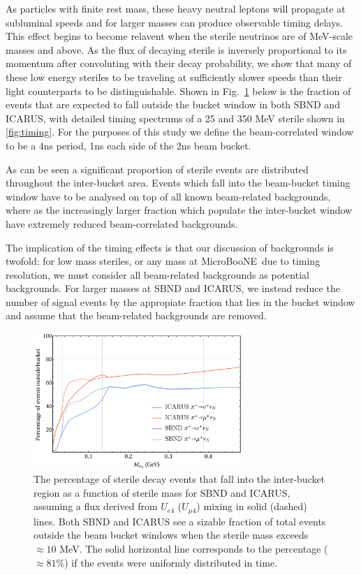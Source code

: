\documentclass[11pt, a4paper]{article}
\newcommand{\reffig}[1]{Fig.~\ref{#1}}
\def\muboone{MicroBooNE}
\begin{document}
As particles with finite rest mass, these heavy neutral leptons will propagate
at subluminal speeds and for larger masses can produce observable timing
delays. This effect begins to become relavent when the sterile neutrinos are of
MeV-scale masses and above. As the flux of decaying sterile is inversely
proportional to its momentum after convoluting with their decay probability, we show that many of these low energy steriles to be
traveling at sufficiently slower speeds than their light counterparts to be distinguishable. Shown
in \reffig{fig:timing_line} below is the fraction of events that are expected
to fall outside the  bucket window in both SBND and ICARUS, with detailed
timing spectrums of a 25 and 350 MeV sterile shown in \ref{fig:timing}. For the purposes of this study we define the beam-correlated window to be a 4ns period, 1ns each side of the 2ns beam bucket.

As can be seen a significant proportion of sterile events are distributed throughout the inter-bucket area. Events which fall into the beam-bucket timing window have to be analysed on top of all known beam-related backgrounds, where as the increasingly larger fraction which populate the inter-bucket window have extremely reduced beam-correlated backgrounds.  

The implication of the timing effects is that our discussion of backgrounds is
twofold: for low mass steriles, or any mass at \muboone\ due to timing
resolution, we must consider all beam-related backgrounds as potential
backgrounds. For larger masses at SBND and ICARUS, we instead reduce the number of signal events by the appropiate fraction that lies in the bucket window and assume that the beam-related backgrounds are removed. 


\begin{figure}[t]
%
\center
%
\includegraphics[width=0.7\textwidth]{figures/line_plots.pdf}
%
\caption{\label{fig:timing_line} The percentage of sterile decay events that
fall into the inter-bucket region as a function of sterile mass for SBND and
ICARUS, assuming a flux derived from $U_{e4}$ ($U_{\mu 4}$) mixing in solid
(dashed) lines. Both SBND and ICARUS see a sizable fraction of total events
outside the beam bucket windows when the sterile mass exceeds $\approx10$ MeV.
The solid horizontal line corresponds to the percentage ($\approx 81$\%) if the
events were uniformly distributed in time.   }
%
\end{figure}
\end{document}
